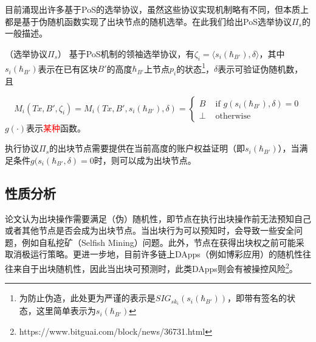 目前涌现出许多基于PoS的选举协议\cite{gilad2017algorand,david2018ouroboros,hanke2018difinity}，虽然这些协议实现机制略有不同，但本质上都是基于伪随机函数实现了出块节点的随机选举。在此我们给出PoS选举协议$\Pi_{s}$的一般描述。

\begin{definition}
（选举协议$\Pi_{s}$） 基于PoS机制的领袖选举协议，有$\zeta_i=\langle s_i(\hbar_{B'}),\delta \rangle$，其中$s_i(\hbar_{B'})$表示在已有区块$B'$的高度$\hbar_{B'}$上节点$p_i$的状态\footnote{为防止伪造，此处更为严谨的表示是$SIG_{sk_i}(s_i(\hbar_{B'}))$，即带有签名的状态，这里简单表示为$s_i(\hbar_{B'})$}，$\delta$表示可验证伪随机数，且

\begin{equation}
\label{eq:pos}
M_i(Tx,B',\zeta_i)=M_i(Tx,B',s_i(\hbar_{B'}),\delta)=\begin{cases}
B & \text{ if } g(s_i(\hbar_{B'}),\delta)=0 \\ 
\bot & \text{ otherwise}
\end{cases}
\end{equation}
$g(\cdot)$表示\textcolor{red}{某种}函数。
\end{definition}


执行协议$\Pi_{s}$的出块节点需要提供在当前高度的账户权益证明（即$s_i(\hbar_{B'})$），当满足条件$g(s_i(\hbar_{B'},\delta)=0$时，则可以成为出块节点。

\subsection{性质分析}
论文\cite{brown2018formal}认为出块操作需要满足（伪）随机性，即节点在执行出块操作前无法预知自己或者其他节点是否会成为出块节点。当出块行为可以预知时，会导致一些安全问题，例如自私挖矿（Selfish Mining）\cite{eyal2018majority}问题。此外，节点在获得出块权之前可能采取消极运行策略\cite{hanke2018difinity}。更进一步地，目前许多链上DApps（例如博彩应用）的随机性往往来自于出块随机性，因此当出块可预测时，此类DApps则会有被操控风险\footnote{https://www.bitguai.com/block/news/36731.html}。

